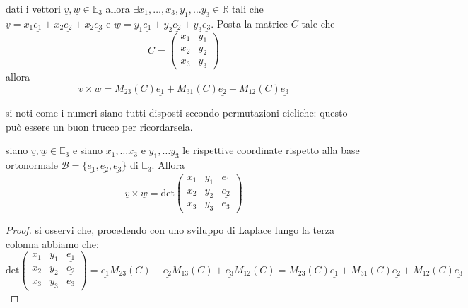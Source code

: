 \begin{prop} 
dati i vettori $\underline{v}, \underline{w} \in \mathbb{E}_3$ allora $\exists x_1, \ldots, x_3, y_1, \ldots y_3 \in \mathbb{R}$ tali che $\underline{v} = x_1 \underline{e_1} + x_2 \underline{e_2} + x_2 \underline{e_3}$ e $\underline{w} = y_1 \underline{e_1} + y_2 \underline{e_2} + y_3 \underline{e_3}$. Posta la matrice $C$ tale che
%
\[C = \begin{pmatrix}
	x_1 & y_1 \\
	x_2 & y_2 \\
	x_3 & y_3
\end{pmatrix}\]
%
allora
%
\begin{equation*}
\underline{v} \times \underline{w} = M_{23}(C)\underline{e_1} + M_{31}(C)\underline{e_2} + M_{12}(C)\underline{e_3}
\end{equation*}
\end{prop}
%
%
\begin{remark}
si noti come i numeri siano tutti disposti secondo permutazioni cicliche: questo può essere un buon trucco per ricordarsela.
\end{remark}
%
\vspace{0.5cm}
\begin{cor}[\textcolor{blue}{matrice del prodotto vettoriale}] 
siano $\underline{v}, \underline{w} \in \mathbb{E}_3$ e siano $x_1, \ldots x_3$ e $y_1, \ldots y_3$ le rispettive coordinate rispetto alla base ortonormale $\mathcal{B} = \{ \underline{e_1}, \underline{e_2}, \underline{e_3}\}$ di $\mathbb{E}_3$. Allora
%
\begin{equation*}
\underline{v} \times \underline{w} = \text{det}\begin{pmatrix}
	x_1 & y_1 & \underline{e_1} \\
	x_2 & y_2 & \underline{e_2} \\
	x_3 & y_3 & \underline{e_3}
\end{pmatrix}
\end{equation*}
%
\label{cor:pr_vett_det}
\end{cor}
%
%
\begin{proof}	
si osservi che, procedendo con uno sviluppo di Laplace lungo la terza colonna abbiamo che:
%
\[\text{det}\begin{pmatrix}
x_1 & y_1 & \underline{e_1} \\
	x_2 & y_2 & \underline{e_2} \\
	x_3 & y_3 & \underline{e_3}
\end{pmatrix} = \underline{e_1} M_{23}(C) - \underline{e_2}M_{13}(C) + \underline{e_3} M_{12}(C) = M_{23}(C) \underline{e_1} + M_{31}(C) \underline{e_2} + M_{12}(C) \underline{e_3}\]
\end{proof}
